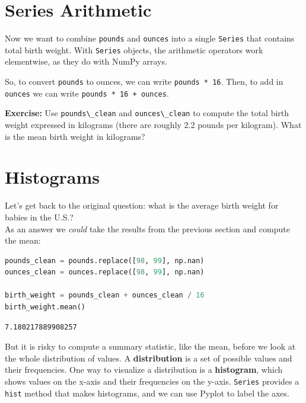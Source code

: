 \documentclass[
]{book}
\newcommand{\passthrough}[1]{#1}
\begin{document}
\section{Series Arithmetic}\label{series-arithmetic}

Now we want to combine \passthrough{\lstinline!pounds!} and
\passthrough{\lstinline!ounces!} into a single
\passthrough{\lstinline!Series!} that contains total birth weight. With
\passthrough{\lstinline!Series!} objects, the arithmetic operators work
elementwise, as they do with NumPy arrays.

So, to convert \passthrough{\lstinline!pounds!} to ounces, we can write
\passthrough{\lstinline!pounds * 16!}. Then, to add in
\passthrough{\lstinline!ounces!} we can write
\passthrough{\lstinline!pounds * 16 + ounces!}.

\textbf{Exercise:} Use \passthrough{\lstinline!pounds\_clean!} and
\passthrough{\lstinline!ounces\_clean!} to compute the total birth
weight expressed in kilograms (there are roughly 2.2 pounds per
kilogram). What is the mean birth weight in kilograms?

\section{Histograms}\label{histograms}

Let's get back to the original question: what is the average birth
weight for babies in the U.S.?\\
As an answer we \emph{could} take the results from the previous section
and compute the mean:

\begin{lstlisting}[language=Python]
pounds_clean = pounds.replace([98, 99], np.nan)
ounces_clean = ounces.replace([98, 99], np.nan)

birth_weight = pounds_clean + ounces_clean / 16
birth_weight.mean()
\end{lstlisting}

\begin{lstlisting}
7.180217889908257
\end{lstlisting}

But it is risky to compute a summary statistic, like the mean, before we
look at the whole distribution of values. A \textbf{distribution} is a
set of possible values and their frequencies. One way to visualize a
distribution is a \textbf{histogram}, which shows values on the x-axis
and their frequencies on the y-axis. \passthrough{\lstinline!Series!}
provides a \passthrough{\lstinline!hist!} method that makes histograms,
and we can use Pyplot to label the axes.
\end{document}
